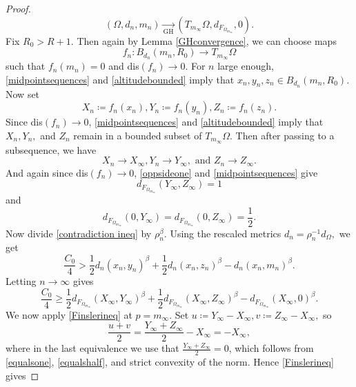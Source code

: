 \documentclass[letterpaper, 11pt, reqno]{amsart}
\theoremstyle{definition}
\begin{document}
\begin{proof}
    \begin{equation}
     (\Omega,d_n,m_n) \xrightarrow[\text{GH}]{\text{}} (T_{m_\infty}\Omega,d_{F_{{\Omega_{m_\infty}}}},0).   
    \end{equation}
    Fix $R_0 > R+1.$ Then again by Lemma \ref{GHconvergence}, we can choose maps
    \begin{equation}
        f_n:B_{d_n}(m_n,R_0) \longrightarrow T_{m_\infty}\Omega
    \end{equation}
    such that $f_n(m_n)=0$ and dis$(f_n) \longrightarrow 0$. For $n$ large enough, \ref{midpointsequences} and \ref{altitudebounded} imply that $x_n,y_n,z_n \in B_{d_n}(m_n,R_0).$ Now set
    \begin{equation}
        X_n \coloneq f_n(x_n), Y_n \coloneq f_n(y_n), Z_n \coloneq f_n(z_n).
    \end{equation}
    Since dis$(f_n) \longrightarrow 0$, \ref{midpointsequences} and \ref{altitudebounded} imply that $X_n, Y_n,$ and $Z_n$ remain in a bounded subset of $T_{m_\infty}\Omega$. Then after passing to a subsequence, we have
    \begin{equation}
        X_n \longrightarrow X_\infty, Y_n \longrightarrow Y_\infty, \text{ and }Z_n \longrightarrow Z_\infty.
    \end{equation}
    And again since dis$(f_n) \longrightarrow 0$, \ref{oppsideone} and \ref{midpointsequences} give
    \begin{equation}\label{equalsone}
        d_{F_{{\Omega_{m_\infty}}}}(Y_\infty,Z_\infty) =1    
    \end{equation}
    and
    \begin{equation}\label{equalshalf}
        d_{F_{{\Omega_{m_\infty}}}}(0,Y_\infty) = d_{F_{{\Omega_{m_\infty}}}}(0, Z_\infty) = \frac{1}{2}.
    \end{equation}
    Now divide \ref{contradiction ineq} by $\rho_n^{\beta}.$ Using the rescaled metrics $d_n=\rho_n^{-1}d_\Omega,$ we get
    \begin{equation}\label{rescaledineq}
      \frac{C_0}{4} > \frac{1}{2}d_n(x_n,y_n)^\beta +
\frac{1}{2}d_n(x_n,z_n)^\beta  - d_n(x_n,m_n)^\beta . 
    \end{equation}
    Letting $n \longrightarrow \infty$ gives
        \begin{equation}\label{contra}
      \frac{C_0}{4} \geq \frac{1}{2}d_{F_{\Omega_{m_\infty}}}(X_\infty,Y_\infty)^\beta +
\frac{1}{2}d_{F_{\Omega_{m_\infty}}}(X_\infty,Z_\infty)^\beta  - d_{F_{\Omega_{m_\infty}}}(X_\infty,0)^\beta.
    \end{equation}
    We now apply \ref{Finslerineq} at $p=m_\infty$. Set $u \coloneq Y_\infty - X_\infty, v \coloneq Z_\infty - X_\infty,$ so
    \begin{equation}
        \frac{u+v}{2} = \frac{Y_\infty+Z_\infty}{2}-X_\infty=-X_\infty,
    \end{equation}
where in the last equivalence we use that $\frac{Y_\infty + Z_\infty}{2} = 0$, which follows from \ref{equalsone}, \ref{equalshalf}, and strict convexity of the norm. 
    Hence \ref{Finslerineq} gives


\end{proof}
\end{document}
